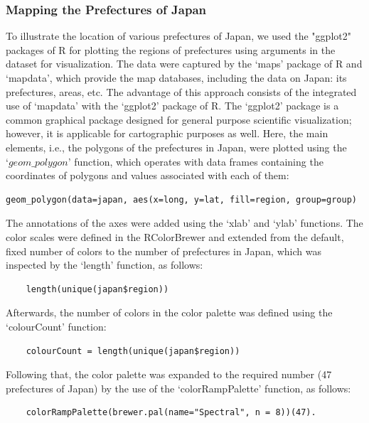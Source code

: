 \documentclass[land,article,accept,pdftex,moreauthors]{Definitions/mdpi}
\begin{document}
\subsubsection{Mapping the Prefectures of Japan}

To illustrate the location of various prefectures of Japan, we used the "ggplot2" packages of R for plotting the regions of prefectures using arguments in the dataset for visualization. The data were captured by the ‘maps’ package of R \cite{Beckeretal2013} and ‘mapdata’, which provide the map databases, including the data on Japan: its prefectures, areas, etc. The advantage of this approach consists of the integrated use of ‘mapdata’ with the ‘ggplot2’ package of R. The `ggplot2' package is a common graphical package designed for general purpose scientific visualization; however, it is applicable for cartographic purposes as well. Here, the main elements, i.e., the polygons of the prefectures in Japan, were plotted using the $‘geom\_polygon’$ function, which operates with data frames containing the coordinates of polygons and values associated with each of them: 
\begin{verbatim}geom_polygon(data=japan, aes(x=long, y=lat, fill=region, group=group)\end{verbatim} 

The annotations of the axes were added using the ‘xlab’ and ‘ylab’ functions. The color scales were defined in the RColorBrewer and extended from the default, fixed number of colors to the number of prefectures in Japan, which was inspected by the ‘length’ function, as follows: 
\begin{verbatim}
	length(unique(japan$region))
\end{verbatim} 

Afterwards, the number %
 of colors in the color palette was defined using the ‘colourCount’ function: 
 \begin{verbatim}
	colourCount = length(unique(japan$region))
\end{verbatim}

Following that, the color palette was expanded to the required number (47 prefectures of Japan) by the use of the ‘colorRampPalette’ function, as follows: 
\begin{verbatim}
	colorRampPalette(brewer.pal(name="Spectral", n = 8))(47).
\end{verbatim}  
\end{document}
